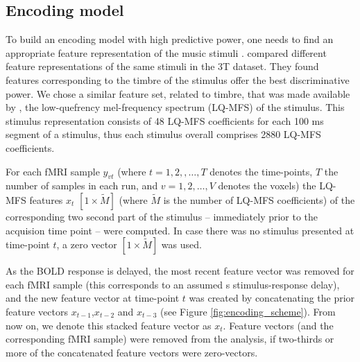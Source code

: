 \subsection*{Encoding model}

To build an encoding model with high predictive power, one needs to find an appropriate feature representation of the music stimuli \citep{holdgraf2017encoding}. \citet{CTK+2012} compared different feature representations of the same stimuli in the 3T dataset. They found features corresponding to the timbre of the stimulus offer the best discriminative power. We chose a similar feature set, related to timbre, that was made available by \citet{HDH+2015}, the low-quefrency mel-frequency spectrum (LQ-MFS) of the stimulus. This stimulus representation consists of 48 LQ-MFS coefficients for each 100 ms segment of a stimulus, thus each stimulus overall comprises 2880 LQ-MFS coefficients.

For each f{MRI} sample $y_{vt}$ (where $t=1,2,,\ldots,T$ denotes the time-points, $T$ the number of samples in each run, and $v=1,2,\ldots,V$ denotes the voxels) the LQ-MFS features $x_{t}$ $[1\times\widetilde{M}]$ (where $\widetilde{M}$ is the number of LQ-MFS coefficients) of the corresponding two second part of the stimulus -- immediately prior to the acquision time point -- were computed. In case there was no stimulus presented at time-point $t$, a zero vector $[1\times\widetilde{M}]$ was used. 

As the BOLD response is delayed,  the most recent feature vector was removed for each f{MRI} sample (this corresponds to an assumed \unit[2]{s} stimulus-response delay), and the new feature vector at time-point $t$ was created by concatenating the prior feature vectors $x_{t-1}$,$x_{t-2}$ and $x_{t-3}$ (see Figure \ref{fig:encoding_scheme}). From now on, we denote this stacked feature vector as $x_{t}$.  Feature vectors (and the corresponding f{MRI} sample) were removed from the analysis, if two-thirds or more of the concatenated feature vectors were zero-vectors.

